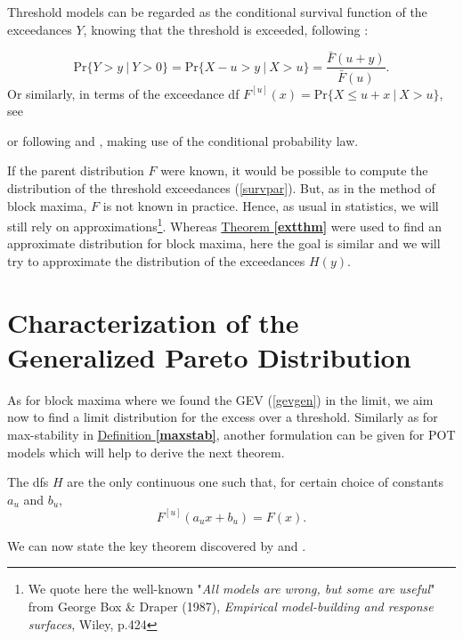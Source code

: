 Threshold models can be regarded as the conditional survival function of the exceedances $Y$, knowing that the threshold is exceeded, following  \citet[pp.147]{beirlant_statistics_2006} :

\begin{equation}\label{survpar}
\text{Pr}\big\{Y>y\ |\ Y>0\big\}=\text{Pr}\big\{X-u>y\ |\ X>u\big\}=\frac{\bar{F}(u+y)}{\bar{F}(u)}.
\end{equation}
Or similarly, in terms of the exceedance df $F^{[u]}(x)=\text{Pr}\{X\leq u+x \ | \ X>u\}$, see \citet[pp.25-29]{reiss_statistical_2007}

or following \citet{charras_extreme_2013} and \citet{rosso_extreme_2015}, making use of the conditional probability law. %

If the parent distribution $F$ were known, it would be possible to compute the distribution of the threshold exceedances (\ref{survpar}). But, as in the method of block maxima, $F$ is not known in practice. Hence, as usual in statistics, we will still rely on approximations\footnote{We quote here the well-known "\textit{All models are wrong, but some are useful}" from George Box \& Draper (1987), \textit{Empirical model-building and response surfaces}, Wiley, p.424}. Whereas \hyperref[extthm]{Theorem \textbf{\ref{extthm}}} were used to find an approximate distribution for block maxima, here the goal is similar and we will try to approximate the distribution of the exceedances $H(y)$.



\section{Characterization of the Generalized Pareto Distribution}\label{sec:charac_gpd}

As for block maxima where we found the GEV (\ref{gevgen}) in the limit, we aim now to find a limit distribution for the excess over a threshold.
Similarly as for max-stability in \hyperref[maxstab]{Definition \textbf{\ref{maxstab}}}, another formulation can be given for POT models which will help to derive the next theorem.

\begin{definition}%
The dfs $H$ are the only continuous one such that, for certain choice of constants $a_u$ and $b_u$, 
	\begin{equation*}
	F^{[u]}(a_ux+b_u)=F(x).
	\end{equation*}
\end{definition}
We can now state the key theorem discovered by \citet{balkema_residual_1974} and \citet{iii_statistical_1975-1}.

